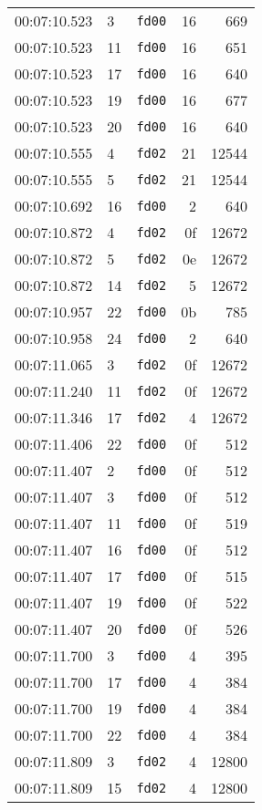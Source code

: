 \documentclass{article}
\begin{document}
\begin{longtable}{lllrr}
00:07:10.523 & 3 & \texttt{fd00} & 16 & 669 \\
00:07:10.523 & 11 & \texttt{fd00} & 16 & 651 \\
00:07:10.523 & 17 & \texttt{fd00} & 16 & 640 \\
00:07:10.523 & 19 & \texttt{fd00} & 16 & 677 \\
00:07:10.523 & 20 & \texttt{fd00} & 16 & 640 \\
00:07:10.555 & 4 & \texttt{fd02} & 21 & 12544 \\
00:07:10.555 & 5 & \texttt{fd02} & 21 & 12544 \\
00:07:10.692 & 16 & \texttt{fd00} & 2 & 640 \\
00:07:10.872 & 4 & \texttt{fd02} & 0f & 12672 \\
00:07:10.872 & 5 & \texttt{fd02} & 0e & 12672 \\
00:07:10.872 & 14 & \texttt{fd02} & 5 & 12672 \\
00:07:10.957 & 22 & \texttt{fd00} & 0b & 785 \\
00:07:10.958 & 24 & \texttt{fd00} & 2 & 640 \\
00:07:11.065 & 3 & \texttt{fd02} & 0f & 12672 \\
00:07:11.240 & 11 & \texttt{fd02} & 0f & 12672 \\
00:07:11.346 & 17 & \texttt{fd02} & 4 & 12672 \\
00:07:11.406 & 22 & \texttt{fd00} & 0f & 512 \\
00:07:11.407 & 2 & \texttt{fd00} & 0f & 512 \\
00:07:11.407 & 3 & \texttt{fd00} & 0f & 512 \\
00:07:11.407 & 11 & \texttt{fd00} & 0f & 519 \\
00:07:11.407 & 16 & \texttt{fd00} & 0f & 512 \\
00:07:11.407 & 17 & \texttt{fd00} & 0f & 515 \\
00:07:11.407 & 19 & \texttt{fd00} & 0f & 522 \\
00:07:11.407 & 20 & \texttt{fd00} & 0f & 526 \\
00:07:11.700 & 3 & \texttt{fd00} & 4 & 395 \\
00:07:11.700 & 17 & \texttt{fd00} & 4 & 384 \\
00:07:11.700 & 19 & \texttt{fd00} & 4 & 384 \\
00:07:11.700 & 22 & \texttt{fd00} & 4 & 384 \\
00:07:11.809 & 3 & \texttt{fd02} & 4 & 12800 \\
00:07:11.809 & 15 & \texttt{fd02} & 4 & 12800 \\

\end{longtable}
\end{document}

